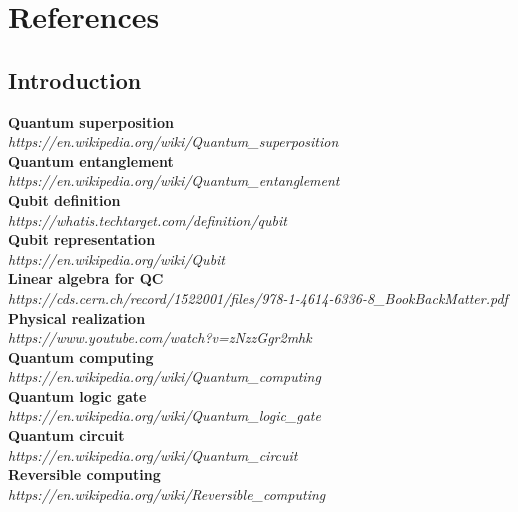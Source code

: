 \documentclass[main.tex]{subfiles}
\begin{document}
\section{References}
	\subsection{Introduction}
	\textbf{Quantum superposition}\\ \textit{https://en.wikipedia.org/wiki/Quantum\_superposition}\\
	\textbf{Quantum entanglement}\\ \textit{https://en.wikipedia.org/wiki/Quantum\_entanglement}\\
	\textbf{Qubit definition}\\ \textit{https://whatis.techtarget.com/definition/qubit}\\
	\textbf{Qubit representation}\\ \textit{https://en.wikipedia.org/wiki/Qubit}\\
	\textbf{Linear algebra for QC}\\ \textit{https://cds.cern.ch/record/1522001/files/978-1-4614-6336-8\_BookBackMatter.pdf}\\
	\textbf{Physical realization}\\ \textit{https://www.youtube.com/watch?v=zNzzGgr2mhk}\\
	\textbf{Quantum computing}\\
	\textit{https://en.wikipedia.org/wiki/Quantum\_computing}\\
	\textbf{Quantum logic gate}\\	
	\textit{https://en.wikipedia.org/wiki/Quantum\_logic\_gate}\\
	\textbf{Quantum circuit}\\
	\textit{https://en.wikipedia.org/wiki/Quantum\_circuit}\\
	\textbf{Reversible computing}\\
	\textit{https://en.wikipedia.org/wiki/Reversible\_computing}\\
	
\end{document}
